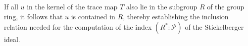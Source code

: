If all $u$ in the kernel of the trace map $T$ also lie in the subgroup $R$ of the group ring, it follows that $u$ is contained in $R$, thereby establishing the inclusion relation needed for the computation of the index $(R^* : \mathcal{P})$ of the Stickelberger ideal.
